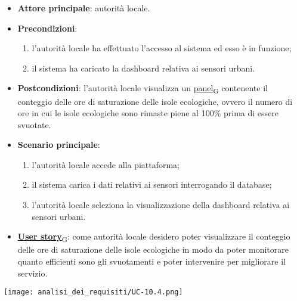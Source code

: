 \begin{itemize}
	\item \textbf{Attore principale}: autorità locale.
	\item \textbf{Precondizioni}:
	      \begin{enumerate}
		      \item l'autorità locale ha effettuato l'accesso al sistema ed esso è in funzione;
		      \item il sistema ha caricato la dashboard relativa ai sensori urbani.
	      \end{enumerate}
	\item \textbf{Postcondizioni}: l'autorità locale visualizza un \href{https://7last.github.io/docs/pb/documentazione-interna/glossario\#panel}{panel\textsubscript{G}} contenente il conteggio delle ore di saturazione delle isole ecologiche,
	      ovvero il numero di ore in cui le isole ecologiche sono rimaste piene al 100\% prima di essere svuotate.
	\item \textbf{Scenario principale}:
	      \begin{enumerate}
		      \item l'autorità locale accede alla piattaforma;
		      \item il sistema carica i dati relativi ai sensori interrogando il database;
		      \item l'autorità locale seleziona la visualizzazione della dashboard relativa ai sensori urbani.
	      \end{enumerate}
	\item \href{https://7last.github.io/docs/pb/documentazione-interna/glossario\#user-story}{\textbf{User story}\textsubscript{G}}:
	      come autorità locale desidero poter visualizzare il conteggio delle ore di saturazione delle isole ecologiche in modo da poter monitorare
	      quanto efficienti sono gli svuotamenti e poter intervenire per migliorare il servizio.
\end{itemize}
\begin{center}
	\texttt{[image: analisi\_dei\_requisiti/UC-10.4.png]}
\end{center}


